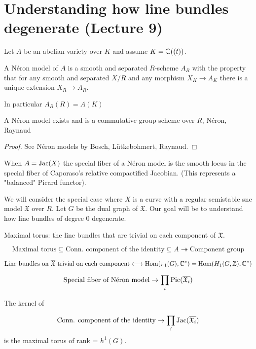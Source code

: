 \section{Understanding how line bundles degenerate (Lecture 9)}

Let $A$ be an abelian variety over $K$ and assume $K=\mathbb{C}((t))$.

\begin{definition} A N\'eron model of $A$ is a smooth and separated $R$-scheme $A_{R}$ with the property that for any smooth and separated $X/R$ and any morphism $X_K\to A_K$ there is a unique extension $X_R\to A_R$. \end{definition}

In particular $A_R(R) = A(K)$

\begin{theorem} A N\'eron model exists and is a commutative group scheme over $R$, N\'eron, Raynaud\end{theorem}
\begin{proof} See N\'eron models by Bosch, L\"utkebohmert, Raynaud. \end{proof}

\noindent When $A=\mathrm{Jac}(X)$ the special fiber of a N\'eron model is the smooth locus in the special fiber of Caporaso's relative compactified Jacobian. (This represents a "balanced" Picard functor).

We will consider the special case where $X$ is a curve with a regular semistable snc model $\mathfrak{X}$ over $R$. Let $G$ be the dual graph of $\mathfrak{X}$. Our goal will be to understand how line bundles of degree 0 degenerate.

\noindent Maximal torus: the line bundles that are trivial on each component of $\overline{\mathfrak{X}}$.

\[\text{Maximal torus} \subseteq \text{Conn. component of the identity} \subseteq A\twoheadrightarrow \text{Component group}\]


\[\text{Line bundles on }\overline{\mathfrak{X}}\text{ trivial on each component} \longleftrightarrow \mathrm{Hom}(\pi_1(G),\mathbb{C}^*) = \mathrm{Hom}(H_1(G,\mathbb{Z}),\mathbb{C}^*)\]

\[\text{Special fiber of N\'eron model}\to \prod_i \mathrm{Pic}(\overline{\mathfrak{X}_i})\]

\noindent The kernel of 

\[\text{Conn. component of the identity}\to \prod_i \mathrm{Jac}(\overline{\mathfrak{X}_i})\] is the maximal torus of rank = $h^1(G)$.

